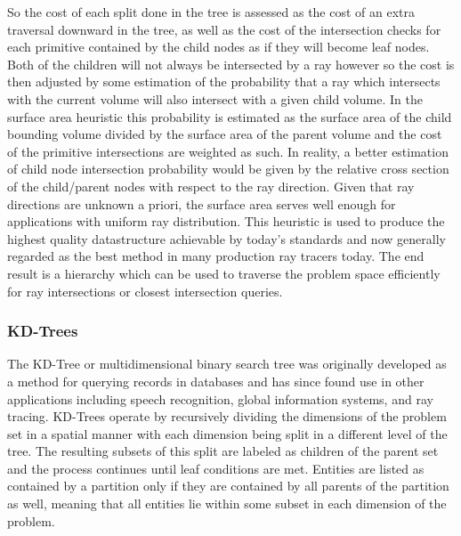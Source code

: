 \documentclass[12pt, a4paper]{article}
\begin{document}
So the cost of each split done in the tree is assessed as the cost of an extra traversal downward in the tree, as well as the cost of the intersection checks for each primitive contained by the child nodes as if they will become leaf nodes. Both of the children will not always be intersected by a ray however so the cost is then adjusted by some estimation of the probability that a ray which intersects with the current volume will also intersect with a given child volume. In the surface area heuristic this probability is estimated as the surface area of the child bounding volume divided by the surface area of the parent volume and the cost of the primitive intersections are weighted as such. In reality, a better estimation of  child node intersection probability would be given by the relative cross section of the child/parent nodes with respect to the ray direction. Given that ray directions are unknown a priori, the surface area serves well enough for applications with uniform ray distribution. This heuristic is used to produce the highest quality datastructure achievable by today's standards and now generally regarded as the best method in many production ray tracers today. The end result is a hierarchy which can be used to traverse the problem space efficiently for ray intersections or closest intersection queries.

\subsubsection{KD-Trees}%

The KD-Tree or multidimensional binary search tree was originally developed as a method for querying records in databases and has since found use in other applications including speech recognition, global information systems, and ray tracing. \cite{Bentley1975} KD-Trees operate by recursively dividing the dimensions of the problem set in a spatial manner with each dimension being split in a different level of the tree. The resulting subsets of this split are labeled as children of the parent set and the process continues until leaf conditions are met. Entities are listed as contained by a partition only if they are contained by all parents of the partition as well, meaning that all entities lie within some subset in each dimension of the problem.
\end{document}
